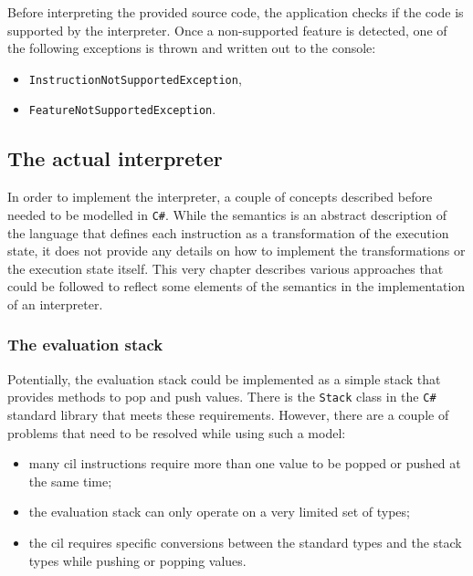 \documentclass{article}
\numberwithin{equation}{section}
\begin{document}
Before interpreting the provided source code, the application checks if the code is supported by the interpreter. Once a non-supported feature is detected, one of the following exceptions is thrown and written out to the console:
\begin{itemize}
	\item{\texttt{InstructionNotSupportedException},}
	\item{\texttt{FeatureNotSupportedException}.}
\end{itemize}

\subsection{The actual interpreter}

In order to implement the interpreter, a couple of concepts described before needed to be modelled in \texttt{C\#}. While the semantics is an abstract description of the language that defines each instruction as a transformation of the execution state, it does not provide any details on how to implement the transformations or the execution state itself. This very chapter describes various approaches that could be followed to reflect some elements of the semantics in the implementation of an interpreter.

\subsubsection{The evaluation stack}

Potentially, the evaluation stack could be implemented as a simple stack that provides methods to pop and push values. There is the \texttt{Stack} class in the \texttt{C\#} standard library that meets these requirements. However, there are a couple of problems that need to be resolved while using such a model:
\begin{itemize}
	\item{many \acrshort{cil} instructions require more than one value to be popped or pushed at the same time;}
	\item{the evaluation stack can only operate on a very limited set of types;}
	\item{the \acrshort{cil} requires specific conversions between the standard types and the stack types while pushing or popping values.}
\end{itemize}
\end{document}

